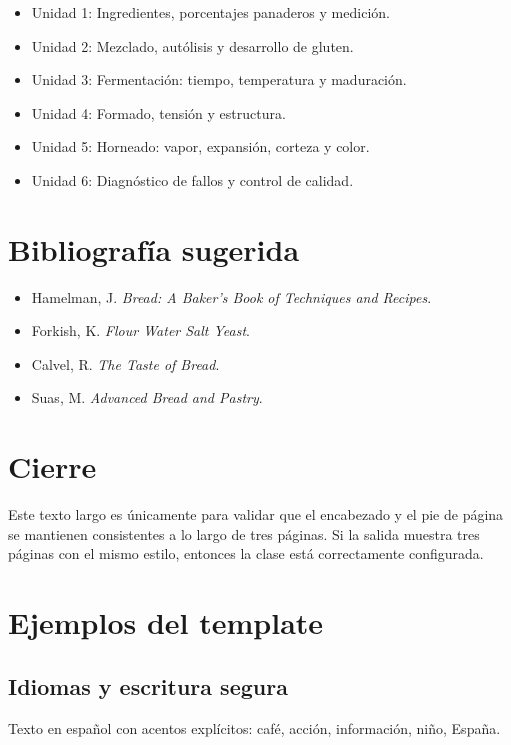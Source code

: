 \documentclass[
  coursetitle={Cómputo Nube y Tecnologías Emergentes},
  coursehours={96},
  coursedate={Verano 2026},
  doctype={Guía del curso},
  otherlangs={english,french},
  authorname={Lázaro},
  authorsurname={Bustio-Martínez},
  authortitle={PhD},
  role={Profesor Investigador},
  email={lbustio@inaoe.mx},
  phone={5559504000},
  ext={7459},
  institution={Instituto Nacional de Astrofísica, Óptica y Electrónica (INAOE)},
  department={Maestría en Ciencias en Tecnologías de Seguridad},
  address={Luis Enrique Erro 1, Sta. Ma. Tonantzintla, San Andrés Cholula, CP 72840, Puebla, México},
  margin={0.5in}
]{lbustio_lecture_notes}
\begin{document}
\begin{itemize}
  \item Unidad 1: Ingredientes, porcentajes panaderos y medición.
  \item Unidad 2: Mezclado, autólisis y desarrollo de gluten.
  \item Unidad 3: Fermentación: tiempo, temperatura y maduración.
  \item Unidad 4: Formado, tensión y estructura.
  \item Unidad 5: Horneado: vapor, expansión, corteza y color.
  \item Unidad 6: Diagnóstico de fallos y control de calidad.
\end{itemize}

\section{Bibliografía sugerida}
\begin{itemize}
  \item Hamelman, J. \textit{Bread: A Baker's Book of Techniques and Recipes}.
  \item Forkish, K. \textit{Flour Water Salt Yeast}.
  \item Calvel, R. \textit{The Taste of Bread}.
  \item Suas, M. \textit{Advanced Bread and Pastry}.
\end{itemize}

\section{Cierre}
Este texto largo es únicamente para validar que el encabezado y el pie de página se mantienen consistentes
a lo largo de tres páginas. Si la salida muestra tres páginas con el mismo estilo, entonces la clase está
correctamente configurada.


\newpage
\section{Ejemplos del template}

\subsection{Idiomas y escritura segura}
Texto en español con acentos explícitos: caf\'e, acci\'on, informaci\'on, ni\~no, Espa\~na.
\end{document}
